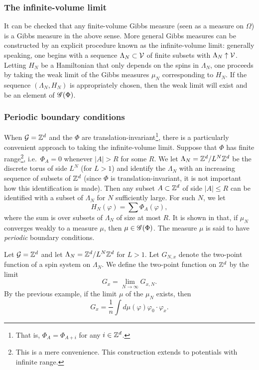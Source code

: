 \subsubsection{The infinite-volume limit}

It can be checked that any finite-volume Gibbs measure (seen as a measure on $\Omega$) is a
Gibbs measure in the above sense. More general Gibbs measures can be constructed by an explicit
procedure known as the infinite-volume limit: generally speaking, one begins with a sequence
$\Lambda_N \subset \mathcal{V}$ of finite subsets with $\Lambda_N\uparrow\mathcal{V}$. Letting
$H_N$ be a Hamiltonian that only depends on the spins in $\Lambda_N$, one proceeds by taking
the weak limit of the Gibbs measures $\mu_N$ corresponding to $H_N$. If the sequence
$(\Lambda_N, H_N)$ is appropriately chosen, then the weak limit will exist and be an element
of $\mathscr{G}(\Phi)$.

\subsubsection{Periodic boundary conditions}

When $\mathcal{G} = { {{\mathbb Z}}^d }$ and the $\Phi$ are translation-invariant\footnote{That is, $\Phi_A = \Phi_{A+i}$
for any $i\in{ {{\mathbb Z}}^d }$.}, there is a particularly convenient approach to taking the infinite-volume
limit. Suppose that $\Phi$ has finite range\footnote{This is a mere convenience. This construction
extends to potentials with infinite range.}, i.e.\ $\Phi_A = 0$ whenever $|A| > R$ for some $R$.
We let $\Lambda_N = { {{\mathbb Z}}^d }/L^N{ {{\mathbb Z}}^d }$ be the discrete torus of side $L^N$ (for $L > 1$) and identify
the $\Lambda_N$ with an increasing sequence of subsets of ${ {{\mathbb Z}}^d }$ (since $\Phi$ is translation-invariant,
it is not important how this identification is made). Then any subset $A \subset { {{\mathbb Z}}^d }$ of side
$|A| \le R$ can be identified with a subset of $\Lambda_N$ for $N$ sufficiently large. For such
$N$, we let
\begin{equation}
H_N(\varphi) = \sum \Phi_A(\varphi),
\end{equation}
where the sum is over subsets of $\Lambda_N$ of size at most $R$. 
It is shown in \cite[Example 4.20]{Georgii11} that, if $\mu_N$
converges weakly to a measure $\mu$, then $\mu \in \mathscr{G}(\Phi)$. The measure $\mu$ is said to have
\emph{periodic} boundary conditions.

\begin{example}
Let $\mathcal{G} = { {{\mathbb Z}}^d }$ and let $\Lambda_N = { {{\mathbb Z}}^d }/L^N{ {{\mathbb Z}}^d }$ for $L > 1$.
Let $G_{N,x}$ denote the two-point function of a spin system on $\Lambda_N$.
We define the two-point function on ${ {{\mathbb Z}}^d }$ by the limit
\begin{equation}
G_x = \lim_{N\to\infty} G_{x,N}.
\end{equation}
By the previous example, if the limit $\mu$ of the $\mu_N$ exists, then
\begin{equation}
G_x = \frac{1}{n} \int d\mu(\varphi) \varphi_0 \cdot \varphi_x.
\end{equation}
\end{example}

